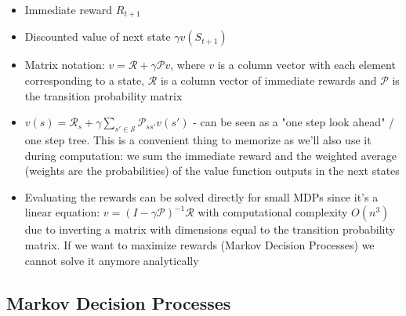 \documentclass{article}
\begin{document}
\begin{itemize}
    \begin{itemize}
         \item Immediate reward $R_{t+1}$
         \item Discounted value of next state $\gamma v(S_{t+1})$
         \item Matrix notation: $v=\mathcal{R} + \gamma \mathcal{P}v$, where $v$ is a column vector with each element corresponding to a state, $\mathcal{R}$ is a column vector of immediate rewards and $\mathcal{P}$ is the transition probability matrix
         \item $v(s)=\mathcal{R}_s+\gamma \sum_{s'\in \mathcal{S}}\mathcal{P}_{ss'}v(s')$ - can be seen as a "one step look ahead" / one step tree. This is a convenient thing to memorize as we'll also use it during computation: we sum the immediate reward and the weighted average (weights are the probabilities) of the value function outputs in the next states
         \item Evaluating the rewards can be solved directly for small MDPs since it's a linear equation: $v=(I - \gamma \mathcal{P})^{-1} \mathcal{R}$ with computational complexity $O(n^3)$ due to inverting a matrix with dimensions equal to the transition probability matrix. If we want to maximize rewards (Markov Decision Processes) we cannot solve it anymore analytically
    \end{itemize}
\end{itemize}

\subsection{Markov Decision Processes}
\end{document}
